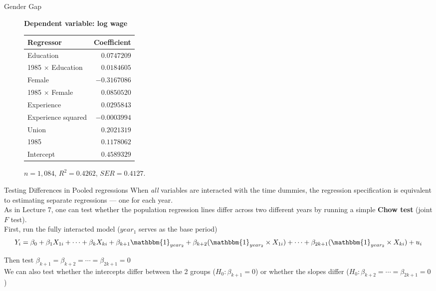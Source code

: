 \documentclass[notes,10pt, aspectratio=169]{beamer}
\begin{document}
\begin{frame}{Gender Gap}
\begin{figure}
  \centering
         \vspace{-1mm}
         \small
\textbf{Dependent variable: log wage}\\[.5em]
\begin{tabular}{lr}
\hline
Regressor & Coefficient\\\hline
Education & $0.0747209$\\
1985 $\times$ Education & $0.0184605$\\
Female & $-0.3167086$\\
1985 $\times$ Female & $0.0850520$\\
Experience & $0.0295843$\\
Experience squared & $-0.0003994$\\
Union & $0.2021319$\\
1985 & $0.1178062$\\
Intercept & $0.4589329$\\\hline
\end{tabular}
\par\medskip
$n=1{,}084$, $R^2=0.4262$, $SER=0.4127$.
\end{figure}
\end{frame}


\begin{frame}{Testing Differences in Pooled regressions}
When \textit{all} variables are interacted with the time dummies, the regression specification is equivalent to estimating separate regressions --- one for each year.\\[1em]

As in Lecture 7, one can test whether the population regression lines differ across two different years by running a simple \textbf{Chow test} (joint $F$ test).\\[1em]

First, run the fully interacted model ($year_1$ serves as the base period)
\begin{equation*}
    Y_i = \beta_0 + \beta_1 X_{1i} + \cdots + \beta_k X_{ki} + \beta_{k+1} \mathbbm{1}_{year_2} + \beta_{k+2}  (\mathbbm{1}_{year_2} \times X_{1i}) + \cdots + \beta_{2k+1}(\mathbbm{1}_{year_2}\times X_{ki})  + u_i
\end{equation*}

Then test $\beta_{k+1}=\beta_{k+2}=\cdots=\beta_{2k+1}=0$\\[1em]

We can also test whether the intercepts differ between the 2 groups ($H_0: \beta_{k+1}=0$) or whether the slopes differ ($H_0: \beta_{k+2}=\cdots=\beta_{2k+1}=0$)
\end{frame}
\end{document}
